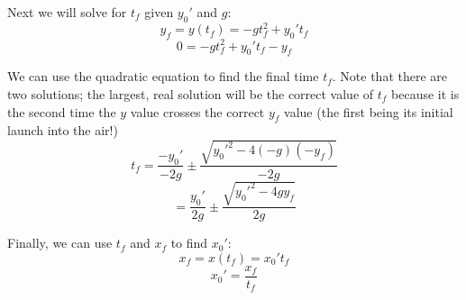 \documentclass[12pt]{article}
\begin{document}
Next we will solve for $t_f$ given $y_0'$ and $g$:
\[ y_f = y(t_f) = -gt_f^2 + y_0't_f \]
\[ 0 = -gt_f^2 + y_0't_f - y_f \]

We can use the quadratic equation to find the final time $t_f$. Note that there are two solutions; the largest, real solution will be the correct value of $t_f$ because it is the second time the $y$ value crosses the correct $y_f$ value (the first being its initial launch into the air!)
\[ t_f = \frac{-y_0'}{-2g} \pm \frac{\sqrt{ y_0'^2 - 4(-g)(-y_f) }}{-2g} \]
\[ = \frac{y_0'}{2g} \pm \frac{\sqrt{ y_0'^2 - 4gy_f }}{2g} \]

Finally, we can use $t_f$ and $x_f$ to find $x_0'$:
\[ x_f = x(t_f) = x_0't_f \]
\[ x_0' = \frac{x_f}{t_f} \]

\end{document}
